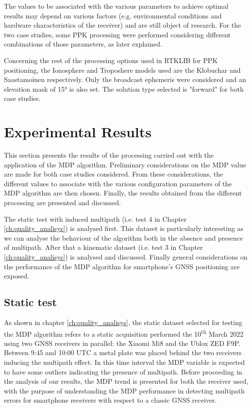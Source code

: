 The values to be associated with the various parameters to achieve optimal results may depend on various factors (e.g. environmental conditions and hardware characteristics of the receiver) and are still object of research. For the two case studies, some PPK processing were performed considering different combinations of those parameters, as later explained. 

Concerning the rest of the processing options used in RTKLIB for PPK positioning, the Ionosphere and Troposhere models used are the Klobuchar and Saastamoinen respectively. Only the broadcast ephemeris were considered and an elevation mask of \ang{15} is also set. The solution type selected is "forward" for both  case studies.

\section{Experimental Results}
This section presents the results of the processing carried out with the application of the MDP algorithm. Preliminary considerations on the MDP value are made for both case studies considered. From these considerations, the different values to associate with the various configuration parameters of the MDP algorithm are then chosen. Finally, the results obtained from the different processing are presented and discussed.

The static test with induced multipath (i.e. test 4 in Chapter \ref{ch:quality_analisys}) is analysed first.  This dataset is particularly interesting as we can analyse the behaviour of the algorithm both in the absence and presence of multipath. After that a kinematic dataset (i.e. test 3 in Chapter \ref{ch:quality_analisys}) is analysed and discussed. Finally general considerations on the performance of the MDP algorithm for smartphone's GNSS positioning are exposed.

\subsection{Static test}

As shown in chapter \ref{ch:quality_analisys}, the static dataset selected for testing the MDP algorithm refers to a static acquisition performed the 10\textsuperscript{th} March 2022 using two GNSS receivers in parallel: the Xiaomi Mi8 and the Ublox ZED F9P. Between 9:45 and 10:00 UTC a metal plate was placed behind the two receivers inducing the multipath effect. In this time interval the MDP variable is expected to have some outliers indicating the presence of multipath.
Before proceeding in the analysis of our results, the MDP trend is presented for both the receiver used, with the purpose of understanding the MDP performance in detecting multipath errors for smartphone receivers with respect to a classic GNSS receiver.

